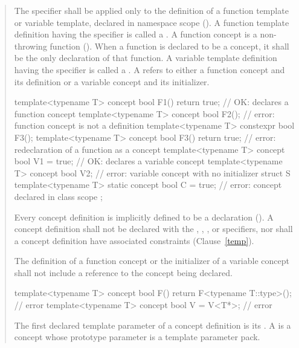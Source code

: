 \begin{quote}

\pnum
The  specifier shall be applied only to the 
definition of a function template or variable template, declared
in namespace scope ().
%
A function template definition having the 
specifier is called a . A function
concept is a non-throwing function ().
%
When a function is declared to be a concept, it shall be the only
declaration of that function.
%
A variable template definition having the  
specifier is called a .
%
A  refers to either a function concept 
and its definition or a variable concept and its initializer.
%
\enterexample
\begin{codeblock}
template<typename T> 
  concept bool F1() { return true; } // OK: declares a function concept
template<typename T> 
  concept bool F2();                 // error: function concept is not a definition
template<typename T> constexpr bool F3();
template<typename T>
  concept bool F3() { return true; } // error: redeclaration of a function as a concept
template<typename T> 
  concept bool V1 = true;            // OK: declares a variable concept
template<typename T> 
  concept bool V2;                   // error: variable concept with no initializer
struct S {
  template<typename T> 
    static concept bool C = true;    // error: concept declared in class scope
};
\end{codeblock}
\exitexample

\pnum
Every concept definition is implicitly defined to be a 
 declaration ().
% 
A concept definition shall not be declared with the 
, , , or 
 specifiers, nor shall a concept definition have associated 
constraints (Clause~\ref{temp}).

\pnum
The definition of a function concept or the initializer of
a variable concept shall not include a reference to the concept being
declared.
%
\enterexample
\begin{codeblock}
template<typename T>
  concept bool F() { return F<typename T::type>(); } // error
template<typename T>
  concept bool V = V<T*>;                            // error
\end{codeblock}
\exitexample

\pnum
The first declared template parameter of a concept definition is its
. 
%
A  is a concept whose prototype parameter
is a template parameter pack.


\end{quote}
